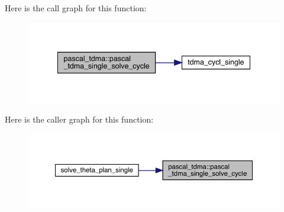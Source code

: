 Here is the call graph for this function\+:
\nopagebreak
\begin{figure}[H]
\begin{center}
\leavevmode
\includegraphics[width=341pt]{namespacepascal__tdma_ac8e377fa86c75126380f0196f6046043_cgraph}
\end{center}
\end{figure}
Here is the caller graph for this function\+:
\nopagebreak
\begin{figure}[H]
\begin{center}
\leavevmode
\includegraphics[width=350pt]{namespacepascal__tdma_ac8e377fa86c75126380f0196f6046043_icgraph}
\end{center}
\end{figure}
